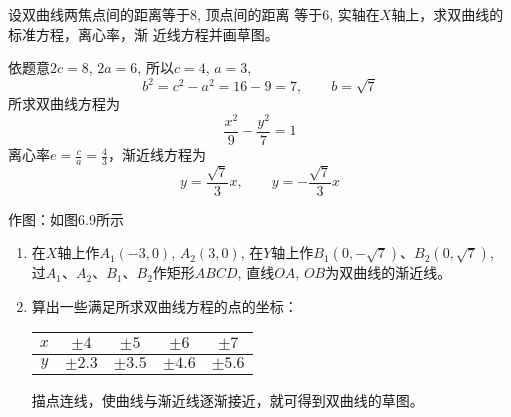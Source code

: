 \begin{example}
    设双曲线两焦点间的距离等于8, 顶点间的距离
等于6, 实轴在$X$轴上，求双曲线的标准方程，离心率，渐
近线方程并画草图。
\end{example}

\begin{solution}
    依题意$2c=8$, $2a=6$, 所以$c=4$, $a=3$,
\[    b^2=c^2-a^2=16-9=7,\qquad  b=\sqrt{7}\]
    所求双曲线方程为
\[\frac{x^2}{9}-\frac{y^2}{7}=1\]
离心率$e=\frac{c}{a}=\frac{4}{3}$，渐近线方程为
\[y=\frac{\sqrt{7}}{3}x,\qquad y=-\frac{\sqrt{7}}{3}x\]

作图：如图6.9所示
\begin{enumerate}
\item 在$X$轴上作$A_1(-3,
0)$, $A_2(3,0)$, 在$Y$轴上作$B_1(0,-\sqrt{7})$、$B_2(0,
\sqrt{7})$, 过$A_1$、$A_2$、$B_1$、$B_2$作矩形$ABCD$, 直线$OA$, 
$OB$为双曲线的渐近线。
\item 算出一些满足所求双曲线方程的点的坐标：
\begin{center}
\begin{tabular}{ccccc}
\hline
$x$ & $\pm 4$ & $\pm 5$ & $\pm 6$ & $\pm 7$\\
\hline
$y$ &  $\pm 2.3$ & $\pm 3.5$ & $\pm 4.6$ & $\pm 5.6$\\
\hline
\end{tabular}
\end{center}
描点连线，使曲线与渐近线逐渐接近，就可得到双曲线的草图。
\end{enumerate}
\end{solution}


